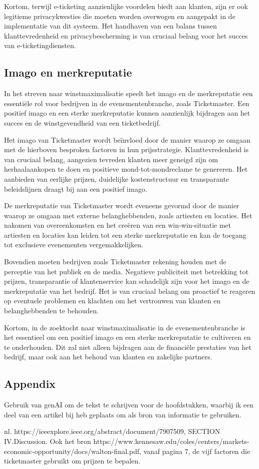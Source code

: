 \vspace{5 mm}
Kortom, terwijl e-ticketing aanzienlijke voordelen biedt aan klanten, zijn er ook legitieme privacykwesties die moeten worden overwogen en aangepakt in de implementatie van dit systeem. Het handhaven van een balans tussen klanttevredenheid en privacybescherming is van cruciaal belang voor het succes van e-ticketingdiensten.

\subsection{Imago en merkreputatie}

In het streven naar winstmaximalisatie speelt het imago en de merkreputatie een essentiële rol voor bedrijven in de evenementenbranche, zoals Ticketmaster. Een positief imago en een sterke merkreputatie kunnen aanzienlijk bijdragen aan het succes en de winstgevendheid van een ticketbedrijf.

Het imago van Ticketmaster wordt beïnvloed door de manier waarop ze omgaan met de hierboven besproken factoren in hun prijsstrategie. Klanttevredenheid is van cruciaal belang, aangezien tevreden klanten meer geneigd zijn om herhaalaankopen te doen en positieve mond-tot-mondreclame te genereren. Het aanbieden van eerlijke prijzen, duidelijke kostenstructuur en transparante beleidslijnen draagt bij aan een positief imago.

De merkreputatie van Ticketmaster wordt eveneens gevormd door de manier waarop ze omgaan met externe belanghebbenden, zoals artiesten en locaties. Het nakomen van overeenkomsten en het creëren van een win-win-situatie met artiesten en locaties kan leiden tot een sterke merkreputatie en kan de toegang tot exclusieve evenementen vergemakkelijken.

Bovendien moeten bedrijven zoals Ticketmaster rekening houden met de perceptie van het publiek en de media. Negatieve publiciteit met betrekking tot prijzen, transparantie of klantenservice kan schadelijk zijn voor het imago en de merkreputatie van het bedrijf. Het is van cruciaal belang om proactief te reageren op eventuele problemen en klachten om het vertrouwen van klanten en belanghebbenden te behouden.

\vspace{5 mm}
Kortom, in de zoektocht naar winstmaximalisatie in de evenementenbranche is het essentieel om een positief imago en een sterke merkreputatie te cultiveren en te onderhouden. Dit zal niet alleen bijdragen aan de financiële prestaties van het bedrijf, maar ook aan het behoud van klanten en zakelijke partners.

\subsection{Appendix}
Gebruik van genAI om de tekst te schrijven voor de hoofdstukken, waarbij ik een deel van een artikel bij heb geplaats om als bron van informatie te gebruiken. 

nl. https://ieeexplore.ieee.org/abstract/document/7907509, SECTION IV.Discussion.
Ook het bron https://www.kennesaw.edu/coles/centers/markets-economic-opportunity/docs/walton-final.pdf, vanaf pagina 7, de vijf factoren die ticketmaster gebruikt om prijzen te bepalen.
